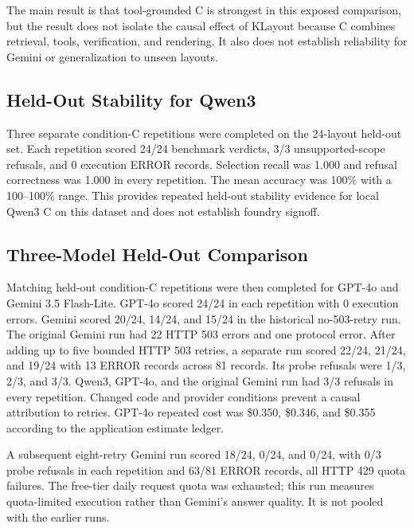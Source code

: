 \documentclass[10pt,twocolumn]{article}
\begin{document}
The main result is that tool-grounded C is strongest in this exposed comparison,
but the result does not isolate the causal effect of KLayout because C combines
retrieval, tools, verification, and rendering. It also does not establish reliability
for Gemini or generalization to unseen layouts.

\subsection{Held-Out Stability for Qwen3}
Three separate condition-C repetitions were completed on the 24-layout held-out set.
Each repetition scored 24/24 benchmark verdicts, 3/3 unsupported-scope refusals,
and 0 execution ERROR records. Selection recall was 1.000 and refusal correctness
was 1.000 in every repetition. The mean accuracy was 100\% with a 100--100\% range.
This provides repeated held-out stability evidence for local Qwen3 C on this dataset
and does not establish foundry signoff.

\subsection{Three-Model Held-Out Comparison}
Matching held-out condition-C repetitions were then completed for GPT-4o and
Gemini 3.5 Flash-Lite. GPT-4o scored 24/24 in each repetition with 0 execution
errors. Gemini scored 20/24, 14/24, and 15/24 in the historical no-503-retry run.
The original Gemini run had 22 HTTP 503 errors and one protocol error. After adding
up to five bounded HTTP 503 retries, a separate run scored 22/24, 21/24, and 19/24
with 13 ERROR records across 81 records. Its probe refusals were 1/3, 2/3, and 3/3.
Qwen3, GPT-4o, and the original Gemini run had 3/3 refusals in every repetition.
Changed code and provider conditions prevent a causal attribution to retries.
GPT-4o repeated cost was
\$0.350, \$0.346, and \$0.355 according to the application estimate ledger.

A subsequent eight-retry Gemini run scored 18/24, 0/24, and 0/24, with 0/3
probe refusals in each repetition and 63/81 ERROR records, all HTTP 429 quota
failures. The free-tier daily request quota was exhausted; this run measures
quota-limited execution rather than Gemini's answer quality. It is not pooled
with the earlier runs.
\end{document}
